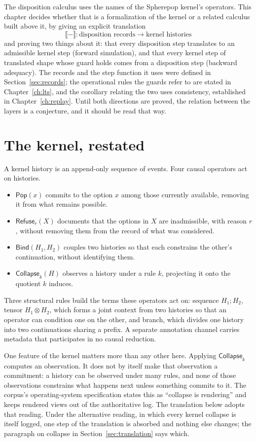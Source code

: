 \documentclass[11pt,openany]{book}
\theoremstyle{remark}
\newcommand{\Pop}{\mathsf{Pop}}
\newcommand{\Refuse}{\mathsf{Refuse}}
\newcommand{\Bind}{\mathsf{Bind}}
\newcommand{\Collapse}{\mathsf{Collapse}}
\begin{document}
The disposition calculus uses the names of the Spherepop kernel's
operators. This chapter decides whether that is a formalization of the
kernel or a related calculus built above it, by giving an explicit
translation
\[
\llbracket-\rrbracket:\text{disposition records}\longrightarrow
\text{kernel histories}
\]
and proving two things about it: that every disposition step translates
to an admissible kernel step (forward simulation), and that every kernel
step of translated shape whose guard holds comes from a disposition step
(backward adequacy). The records and the step function it uses were
defined in Section~\ref{sec:records}; the operational rules the guards
refer to are stated in Chapter~\ref{ch:lts}, and the corollary relating
the two uses consistency, established in Chapter~\ref{ch:replay}. Until
both directions are proved, the relation between the layers is a
conjecture, and it should be read that way.

\section{The kernel, restated}

A kernel history is an append-only sequence of events. Four causal
operators act on histories.
\begin{itemize}[leftmargin=1.5em]
\item $\Pop(x)$ commits to the option $x$ among those currently available,
removing it from what remains possible.
\item $\Refuse_r(X)$ documents that the options in $X$ are inadmissible,
with reason $r$, without removing them from the record of what was
considered.
\item $\Bind(H_1,H_2)$ couples two histories so that each constrains the
other's continuation, without identifying them.
\item $\Collapse_k(H)$ observes a history under a rule $k$, projecting it
onto the quotient $k$ induces.
\end{itemize}
Three structural rules build the terms these operators act on: sequence
$H_1;H_2$, tensor $H_1\otimes H_2$, which forms a joint context from two
histories so that an operator can condition one on the other, and branch,
which divides one history into two continuations sharing a prefix. A
separate annotation channel carries metadata that participates in no
causal reduction.

One feature of the kernel matters more than any other here. Applying
$\Collapse_k$ computes an observation. It does not by itself make that
observation a commitment: a history can be observed under many rules, and
none of those observations constrains what happens next unless something
commits to it. The corpus's operating-system specification states this as
``collapse is rendering'' and keeps rendered views out of the
authoritative log. The translation below adopts that reading. Under the
alternative reading, in which every kernel collapse is itself logged, one
step of the translation is absorbed and nothing else changes; the paragraph
on collapse in Section~\ref{sec:translation} says which.
\end{document}

